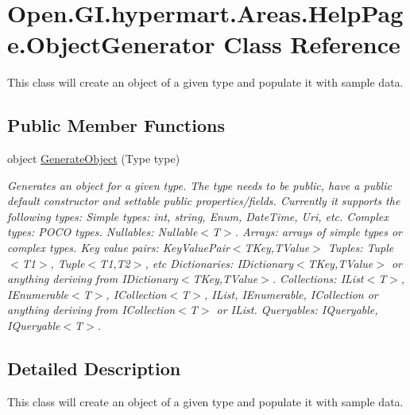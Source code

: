 \hypertarget{class_open_1_1_g_i_1_1hypermart_1_1_areas_1_1_help_page_1_1_object_generator}{}\section{Open.\+G\+I.\+hypermart.\+Areas.\+Help\+Page.\+Object\+Generator Class Reference}
\label{class_open_1_1_g_i_1_1hypermart_1_1_areas_1_1_help_page_1_1_object_generator}


This class will create an object of a given type and populate it with sample data.  


\subsection*{Public Member Functions}
\begin{DoxyCompactItemize}
\item 
object \hyperlink{class_open_1_1_g_i_1_1hypermart_1_1_areas_1_1_help_page_1_1_object_generator_a118924d1ff5f565e6e9c2893d36f35d2}{Generate\+Object} (Type type)
\begin{DoxyCompactList}\small\item\em Generates an object for a given type. The type needs to be public, have a public default constructor and settable public properties/fields. Currently it supports the following types\+: Simple types\+: int, string, Enum, Date\+Time, Uri, etc. Complex types\+: P\+O\+CO types. Nullables\+: Nullable$<$\+T$>$. Arrays\+: arrays of simple types or complex types. Key value pairs\+: Key\+Value\+Pair$<$\+T\+Key,\+T\+Value$>$ Tuples\+: Tuple$<$\+T1$>$, Tuple$<$\+T1,\+T2$>$, etc Dictionaries\+: I\+Dictionary$<$\+T\+Key,\+T\+Value$>$ or anything deriving from I\+Dictionary$<$\+T\+Key,\+T\+Value$>$. Collections\+: I\+List$<$\+T$>$, I\+Enumerable$<$\+T$>$, I\+Collection$<$\+T$>$, I\+List, I\+Enumerable, I\+Collection or anything deriving from I\+Collection$<$\+T$>$ or I\+List. Queryables\+: I\+Queryable, I\+Queryable$<$\+T$>$. \end{DoxyCompactList}\end{DoxyCompactItemize}


\subsection{Detailed Description}
This class will create an object of a given type and populate it with sample data. 



